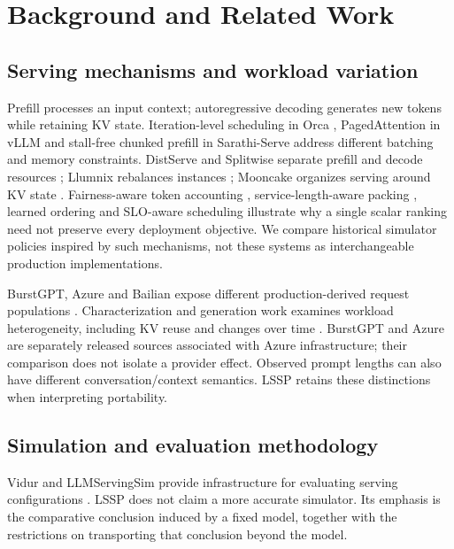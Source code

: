 \section{Background and Related Work}\label{sec:related}
\label{sec:related-serving}
\subsection{Serving mechanisms and workload variation}
Prefill processes an input context; autoregressive decoding generates new
tokens while retaining KV state. Iteration-level scheduling in Orca
\citep{yu2022orca}, PagedAttention in vLLM \citep{kwon2023vllm} and
stall-free chunked prefill in Sarathi-Serve \citep{agrawal2024sarathi}
address different batching and memory constraints. DistServe and Splitwise
separate prefill and decode resources \citep{zhong2024distserve,patel2024splitwise};
Llumnix rebalances instances \citep{sun2024llumnix}; Mooncake organizes
serving around KV state \citep{qin2025mooncake}. Fairness-aware token
accounting \citep{sheng2024vtc}, service-length-aware packing
\citep{jin2023s3}, learned ordering \citep{efficientllmscheduling2024}
and SLO-aware scheduling \citep{slai2025} illustrate why a single scalar
ranking need not preserve every deployment objective. We compare historical
simulator policies inspired by such mechanisms, not these systems as
interchangeable production implementations.

\label{sec:related-workloads}
BurstGPT, Azure and Bailian expose different production-derived request
populations \citep{burstgpt2025,azure2024trace,bailianqwen2026}.
Characterization and generation work examines workload heterogeneity,
including KV reuse and changes over time
\citep{kvcache_wild2025,ayearinllmserving2026,servegen2026}.
BurstGPT and Azure are separately released sources associated with Azure
infrastructure; their comparison does not isolate a provider effect.
Observed prompt lengths can also have different conversation/context
semantics. LSSP retains these distinctions when interpreting portability.

\subsection{Simulation and evaluation methodology}\label{sec:related-simulators}
Vidur and LLMServingSim provide infrastructure for evaluating serving
configurations \citep{vidur2024,llmservingsim2024,llmservingsim2_2025}.
LSSP does not claim a more accurate simulator. Its emphasis is the
comparative conclusion induced by a fixed model, together with the
restrictions on transporting that conclusion beyond the model.

